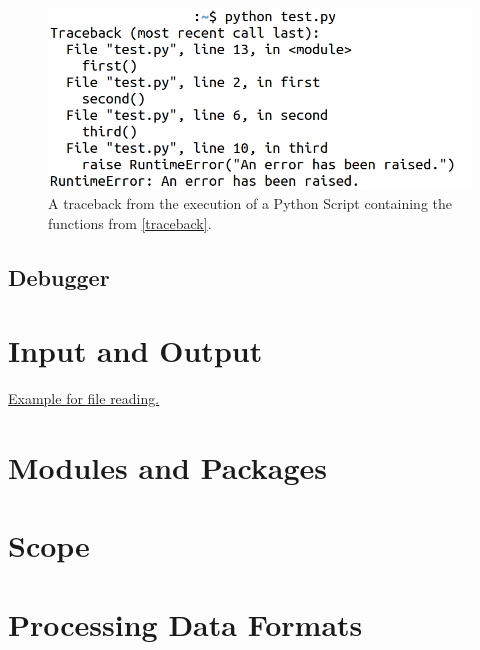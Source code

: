 \documentclass{article}
\begin{document}
\begin{figure}[h]
    \centering
    \includegraphics[width=.8\textwidth]{file-traceback.png}
    \caption{A traceback from the execution of a Python Script containing the functions from \ref{traceback}.}
    \label{file-traceback}
\end{figure}

\subsection{Debugger}



\section{Input and Output}

\href{http://pythontutor.com/visualize.html\#code=\%23\%20Opening\%20a\%20file\%20is\%20not\%20allowed\%20on\%20pythontutor.\%0A\%23\%20StringIO\%20gives\%20us\%20an\%20object\%0A\%23\%20that\%20behaves\%20like\%20a\%20file\%20handler.\%0Afrom\%20io\%20import\%20StringIO\%0A\%0Adef\%20message\%28file\%29\%3A\%0A\%20\%20\%20\%20if\%20file.closed\%3A\%0A\%20\%20\%20\%20\%20\%20\%20\%20print\%28\%22The\%20file\%20is\%20closed\%22\%29\%0A\%20\%20\%20\%20else\%3A\%0A\%20\%20\%20\%20\%20\%20\%20\%20print\%28\%22The\%20file\%20is\%20open.\%22\%29\%0A\%0A\%0A\%23\%20with\%20open\%28\%22filename\%22,\%20\%22r\%22\%29\%20as\%20file\%3A\%0Awith\%20StringIO\%28\%22Fake\%20file\%20content.\%22\%29\%20as\%20file\%3A\%0A\%20\%20\%20\%20message\%28file\%29\%0A\%20\%20\%20\%20print\%28file.read\%28\%29\%29\%0A\%20\%20\%20\%20print\%28file.read\%28\%29\%29\%0A\%20\%20\%20\%20file.seek\%280\%29\%0A\%20\%20\%20\%20print\%28file.read\%28\%29\%29\%0A\%0Amessage\%28file\%29\&cumulative=false\&curInstr=17\&heapPrimitives=nevernest\&mode=display\&origin=opt-frontend.js\&py=3\&rawInputLstJSON=\%5B\%5D\&textReferences=false}{Example for file reading.}

\section{Modules and Packages}
\section{Scope}
\section{Processing Data Formats}


\printbibliography[type=book,title={Book Sources}]
\end{document}
